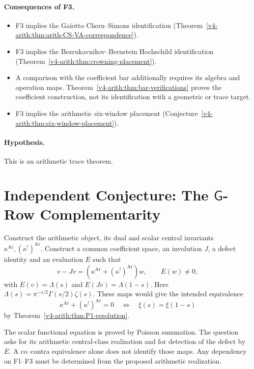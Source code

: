 \paragraph{Consequences of F3.}
\begin{itemize}
\item F3 implies the Gaiotto Chern--Simons identification
(Theorem~\ref{v4-arith:thm:arith-CS-VA-correspondence}).
\item F3 implies the Bezrukavnikov--Bernstein Hochschild identification
(Theorem~\ref{v4-arith:thm:crowning-placement}).
\item A comparison with the coefficient bar additionally requires
its algebra and operation maps.
Theorem~\ref{v4-arith:thm:bar-verifications} proves the coefficient
construction, not its identification with a geometric or trace target.
\item F3 implies the arithmetic six-window placement
(Conjecture~\ref{v4-arith:thm:six-window-placement}).
\end{itemize}

\paragraph{Hypothesis.} This is an arithmetic trace theorem.

\section{Independent Conjecture: The \(\mathsf{G}\)-Row Complementarity}
\label{v4-arith:app:C:G-row-independent}

\begin{question}
\label{v4-arith:app:C:G-row-statement}
Construct the arithmetic object, its dual and scalar central
invariants \(\kappa^{\mathrm{Ar}},(\kappa^!)^{\mathrm{Ar}}\).
Construct a common coefficient space, an involution \(J\),
a defect identity and an evaluation \(E\) such that
\[
 v-Jv=(\kappa^{\mathrm{Ar}}+(\kappa^!)^{\mathrm{Ar}})w,
 \qquad E(w)\ne0,
\]
with \(E(v)=\Lambda(s)\) and \(E(Jv)=\Lambda(1-s)\).
Here \(\Lambda(s)=\pi^{-s/2}\Gamma(s/2)\zeta(s)\).
These maps would give the intended equivalence
\[
 \kappa^{\mathrm{Ar}}+(\kappa^!)^{\mathrm{Ar}}=0
 \quad\Longleftrightarrow\quad\xi(s)=\xi(1-s)
\]
by Theorem~\ref{v4-arith:thm:P1-resolution}.
\end{question}

The scalar functional equation is proved by Poisson summation.
The question asks for its arithmetic central-class realization
and for detection of the defect by \(E\).
A co--contra equivalence alone does not identify those maps.
Any dependency on F1--F3 must be determined from the proposed
arithmetic realization.

